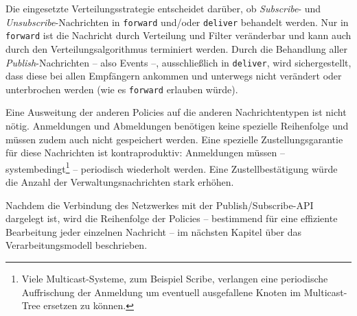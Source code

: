 \begin{table}[!h]
\caption{Verbindungsmatrix}
\label{tab:verbindungsmatrix}
\end{table}

Die eingesetzte Verteilungsstrategie entscheidet darüber, ob \emph{Subscribe}- und \emph{Unsubscribe}-Nachrichten in \texttt{forward} und/oder \texttt{deliver} behandelt werden. Nur in \texttt{forward} ist die Nachricht durch Verteilung und Filter veränderbar und kann auch durch den Verteilungsalgorithmus terminiert werden. Durch die Behandlung aller \emph{Publish}-Nachrichten -- also Events --, ausschließlich in \texttt{deliver}, wird sichergestellt, dass diese bei allen Empfängern ankommen und unterwegs nicht verändert oder unterbrochen werden (wie es \texttt{forward} erlauben würde).

Eine Ausweitung der anderen Policies auf die anderen Nachrichtentypen ist nicht nötig. Anmeldungen und Abmeldungen benötigen keine spezielle Reihenfolge und müssen zudem auch nicht gespeichert werden. Eine spezielle Zustellungsgarantie für diese Nachrichten ist  kontraproduktiv:  Anmeldungen müssen -- systembedingt\footnote{Viele Multicast-Systeme, zum Beispiel Scribe, verlangen eine periodische Auffrischung der Anmeldung um eventuell ausgefallene Knoten im Multicast-Tree ersetzen zu können.} -- periodisch wiederholt werden. Eine Zustellbestätigung würde die Anzahl der Verwaltungsnachrichten stark erhöhen.

Nachdem die Verbindung des Netzwerkes mit der Publish/Subscribe-API dargelegt ist, wird die Reihenfolge der Policies -- bestimmend für eine effiziente Bearbeitung jeder einzelnen Nachricht -- im nächsten Kapitel über das Verarbeitungsmodell beschrieben.

